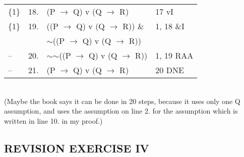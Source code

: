 \documentclass[a4paper,12pt]{article}
\newcommand{\ra}{$\rightarrow$ }
\newcommand{\s}{$\sim$}
\begin{document}
\begin{enumerate}[label=\arabic*,leftmargin=*]
\begin{enumerate}[label=\arabic*.]
\begin{minipage}{\textwidth}
\begin{tabular}{l l l l}
                        \{1\} & 18. & (P \ra Q) v (Q \ra R) & 17 vI\\
                        \{1\} & 19. & ((P \ra Q) v (Q \ra R)) \& & 1, 18 \&I\\
                         & &  \s ((P \ra Q) v (Q \ra R)) & \\
                        -- & 20. & \s \s ((P \ra Q) v (Q \ra R)) & 1, 19 RAA\\
                        -- & 21. & (P \ra Q) v (Q \ra R) & 20 DNE\\
                    \end{tabular}\\
                    (Maybe the book says it can be done in 20 steps, because it uses only one Q assumption, and uses the assumption on line 2. for the assumption which is written in line 10. in my proof.)
                \end{minipage}

        \end{enumerate}
    \end{enumerate}

    \subsection*{REVISION EXERCISE IV}
\end{document}
